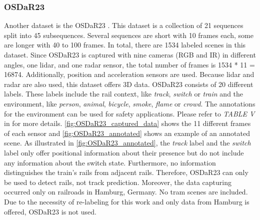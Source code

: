 \subsubsection{OSDaR23}
Another dataset is the OSDaR23 \cite{oSDaR23}.
This dataset is a collection of 21 sequences split into 45 subsequences.
Several sequences are short with 10 frames each, some are longer with 40 to 100 frames.
In total, there are 1534 labeled scenes in this dataset.
Since OSDaR23 is captured with nine cameras (\ac{RGB} and \ac{IR}) in different angles, one lidar, and one radar sensor, the total number of frames is 1534 * 11 = 16874.
Additionally, position and acceleration sensors are used.
Because lidar and radar are also used, this dataset offers 3D data.
OSDaR23 consists of 20 different labels.
These labels include the rail context, like \textit{track}, \textit{switch} or \textit{train} and the environment, like \textit{person}, \textit{animal}, \textit{bicycle}, \textit{smoke}, \textit{flame} or \textit{crowd}.
The annotations for the environment can be used for safety applications.
Please refer to \textit{TABLE V} in \cite{oSDaR23} for more details.
\autoref{fig:OSDaR23_captured_data} shows the 11 different frames of each sensor and \autoref{fig:OSDaR23_annotated} shows an example of an annotated scene.
As illustrated in \autoref{fig:OSDaR23_annotated}, the \textit{track} label and the \textit{switch} label only offer positional information about their presence but do not include any information about the switch state.
Furthermore, no information distinguishes the train's rails from adjacent rails.
Therefore, OSDaR23 can only be used to detect rails, not track prediction.
Moreover, the data capturing occurred only on railroads in Hamburg, Germany.
No tram scenes are included.
Due to the necessity of re-labeling for this work and only data from Hamburg is offered, OSDaR23 is not used.


